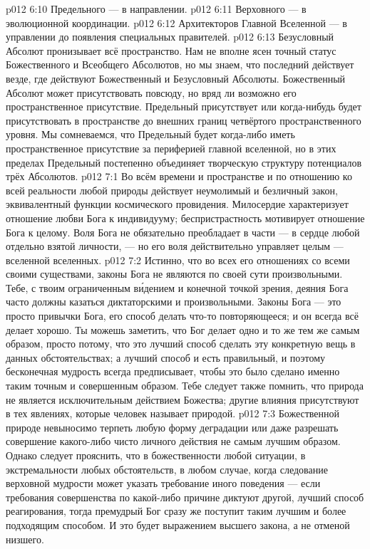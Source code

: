 \vs p012 6:10 Предельного --- в направлении.
\vs p012 6:11 Верховного --- в эволюционной координации.
\vs p012 6:12 Архитекторов Главной Вселенной --- в управлении до появления специальных правителей.
\vs p012 6:13 \pc Безусловный Абсолют пронизывает всё пространство. Нам не вполне ясен точный статус Божественного и Всеобщего Абсолютов, но мы знаем, что последний действует везде, где действуют Божественный и Безусловный Абсолюты. Божественный Абсолют может присутствовать повсюду, но вряд ли возможно его пространственное присутствие. Предельный присутствует или когда\hyp{}нибудь будет присутствовать в пространстве до внешних границ четвёртого пространственного уровня. Мы сомневаемся, что Предельный будет когда\hyp{}либо иметь пространственное присутствие за периферией главной вселенной, но в этих пределах Предельный постепенно объединяет творческую структуру потенциалов трёх Абсолютов.
\vs p012 7:1 Во всём времени и пространстве и по отношению ко всей реальности любой природы действует неумолимый и безличный закон, эквивалентный функции космического провидения. Милосердие характеризует отношение любви Бога к индивидууму; беспристрастность мотивирует отношение Бога к целому. Воля Бога не обязательно преобладает в части --- в сердце любой отдельно взятой личности, --- но его воля действительно управляет целым --- вселенной вселенных.
\vs p012 7:2 \pc Истинно, что во всех его отношениях со всеми своими существами, законы Бога не являются по своей сути произвольными. Тебе, с твоим ограниченным в\'идением и конечной точкой зрения, деяния Бога часто должны казаться диктаторскими и произвольными. Законы Бога --- это просто привычки Бога, его способ делать что\hyp{}то повторяющееся; и он всегда всё делает хорошо. Ты можешь заметить, что Бог делает одно и то же тем же самым образом, просто потому, что это лучший способ сделать эту конкретную вещь в данных обстоятельствах; а лучший способ и есть правильный, и поэтому бесконечная мудрость всегда предписывает, чтобы это было сделано именно таким точным и совершенным образом. Тебе следует также помнить, что природа не является исключительным действием Божества; другие влияния присутствуют в тех явлениях, которые человек называет природой.
\vs p012 7:3 Божественной природе невыносимо терпеть любую форму деградации или даже разрешать совершение какого\hyp{}либо чисто личного действия не самым лучшим образом. Однако следует прояснить, что  в божественности любой ситуации, в экстремальности любых обстоятельств, в любом случае, когда следование верховной мудрости может указать требование иного поведения --- если требования совершенства по какой\hyp{}либо причине диктуют другой, лучший способ реагирования, тогда премудрый Бог сразу же поступит таким лучшим и более подходящим способом. И это будет выражением высшего закона, а не отменой низшего.
